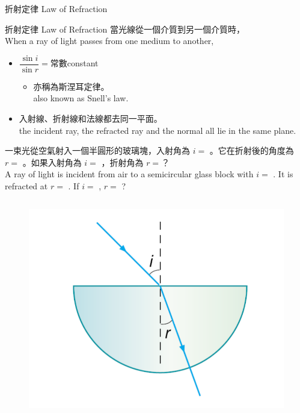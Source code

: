 \documentclass[beamer=true]{standalone}
\begin{document}
\begin{frame}{折射定律 Law of Refraction}
    \begin{alertblock}
        {折射定律 Law of Refraction}
            當光線從一個介質到另一個介質時，\\When a ray of light passes from one medium to another,\bigskip
        \begin{itemize}
        \setlength{\itemsep}{.8em}
            \item $\dfrac{\sin i}{\sin r}=$常數constant\medskip
            \begin{itemize}
                \item 亦稱為斯涅耳定律。\\also known as Snell's law.
            \end{itemize}
            \item 入射線、折射線和法線都去同一平面。\\the incident ray, the refracted ray and the normal all lie in the same plane.
        \end{itemize}

    \end{alertblock}
    
\end{frame}

\begin{eg}

    一束光從空氣射入一個半圓形的玻璃塊，入射角為 $i =$ 。它在折射後的角度為 $r =$ 。如果入射角為 $i =$ ，折射角為 $r =$？\\A ray of light is incident from air to a semicircular glass block with $i =$ . It is refracted at $r =$ . If $i =$ , $r =$ ?
    \begin{columns}

        \begin{figure}
            \centering
            \includegraphics[width=1\linewidth]{assets/218129849734.png}
            
            
        \end{figure}
    \end{columns}
\end{eg}
\end{document}
